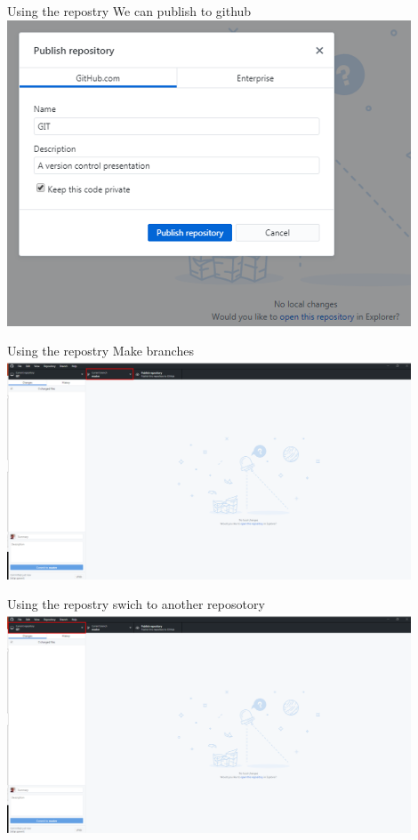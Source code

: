 \documentclass[10pt]{beamer}
\begin{document}
\begin{frame}[fragile]{Using the repostry}
	\small We can publish to github
	\includegraphics[width=12cm]{Figs/GHD/init_00}
\end{frame}

\begin{frame}[fragile]{Using the repostry}
	\small Make branches
	\includegraphics[width=12cm]{Figs/GHD/outline_04}
\end{frame}

\begin{frame}[fragile]{Using the repostry}
	\small swich to another reposotory
	\includegraphics[width=12cm]{Figs/GHD/outline_05}
\end{frame}
\end{document}
